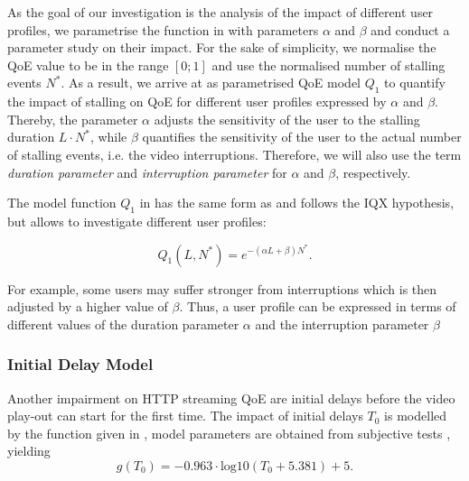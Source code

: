 As the goal of our investigation is the analysis of the impact of different user profiles, we parametrise the function in  with parameters \(\alpha\) and \(\beta\) and conduct a parameter study on their impact. 
For the sake of simplicity, we normalise the QoE value to be in the range \(\left[0;1\right]\)  and use the normalised number of stalling events \(N^*\). 
As a result, we arrive at  as parametrised \gls{QoE} model \(Q_1\) to quantify the impact of stalling on QoE for different user profiles expressed by \(\alpha\) and \(\beta\). 
Thereby, the parameter \(\alpha\) adjusts the sensitivity of the user to the stalling duration \(L\cdot N^*\), while \(\beta\) quantifies the sensitivity of the user to the actual number of stalling events, i.e. the video interruptions.
Therefore, we will also use the term \emph{duration parameter} and \emph{interruption parameter} for \(\alpha\) and \(\beta\), respectively.

The model function \(Q_1\) in  has the same form as  and follows the IQX hypothesis, but allows to investigate different user profiles:

\begin{equation}
   Q_1(L,N^*) = e^{-\left( \alpha L + \beta\right) N^*}.
\label{eq:application:qoe_user_behaviour:typical_user_scenarios:youtube_qoe:stalling:parameterized_model}
\end{equation}

For example, some users may suffer stronger from interruptions which is then adjusted by a higher value of \(\beta\).
Thus, a user profile can be expressed in terms of different values of the duration parameter \(\alpha\) and the interruption parameter \(\beta\)

\subsubsection*{Initial Delay  Model}\label{sec:application:qoe_user_behaviour:typical_user_scenarios:initial_delay}
Another impairment on \gls{HTTP} streaming \gls{QoE} are initial delays before the video play-out can start for the first time.
The impact of initial delays \(T_0\) is modelled by the function given in , model parameters are obtained from subjective tests \cite{Hossfeld2012c}, yielding
\begin{equation}
g(T_0)=-0.963 \cdot \mathrm{log10}(T_0 + 5.381) + 5.
\label{eq:application:qoe_user_behaviour:typical_user_scenarios:initial_delay:original_model}
\end{equation}

